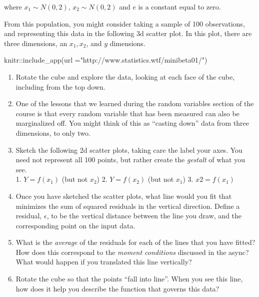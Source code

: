 \documentclass[
]{book}
\newenvironment{Shaded}{\begin{snugshade}}{\end{snugshade}}
\newcommand{\AttributeTok}[1]{\textcolor[rgb]{0.77,0.63,0.00}{#1}}
\newcommand{\FunctionTok}[1]{\textcolor[rgb]{0.00,0.00,0.00}{#1}}
\newcommand{\NormalTok}[1]{#1}
\newcommand{\SpecialCharTok}[1]{\textcolor[rgb]{0.00,0.00,0.00}{#1}}
\newcommand{\StringTok}[1]{\textcolor[rgb]{0.31,0.60,0.02}{#1}}
\providecommand{\tightlist}{%
  \setlength{\itemsep}{0pt}\setlength{\parskip}{0pt}}
\theoremstyle{definition}
\theoremstyle{definition}
\theoremstyle{definition}
\theoremstyle{definition}
\theoremstyle{remark}
\begin{document}
where \(x_1 \sim N(0,2)\), \(x_2 \sim N(0,2)\) and \(e\) is a constant equal to zero.

From this population, you might consider taking a sample of 100 observations, and representing this data in the following 3d scatter plot. In this plot, there are three dimensions, an \(x_1, x_2\), and \(y\) dimensions.

\begin{Shaded}
\begin{Highlighting}[]
\NormalTok{knitr}\SpecialCharTok{::}\FunctionTok{include\_app}\NormalTok{(}\AttributeTok{url =}\StringTok{"http://www.statistics.wtf/minibeta01/"}\NormalTok{)}
\end{Highlighting}
\end{Shaded}

\begin{enumerate}
\def\labelenumi{\arabic{enumi}.}
\tightlist
\item
  Rotate the cube and explore the data, looking at each face of the cube, including from the top down.
\item
  One of the lessons that we learned during the random variables section of the course is that every random variable that has been measured can also be marginalized off. You might think of this as ``casting down'' data from three dimensions, to only two.
\item
  Sketch the following 2d scatter plots, taking care the label your axes. You need not represent all 100 points, but rather create the \emph{gestalt} of what you see.\\
  1. \(Y = f(x_1)\) (but not \(x_2\))
  2. \(Y = f(x_2)\) (but not \(x_1\))
  3. \(x2 = f(x_1)\)
\item
  Once you have sketched the scatter plots, what line would you fit that minimizes the sum of squared residuals in the vertical direction. Define a residual, \(\epsilon\), to be the vertical distance between the line you draw, and the corresponding point on the input data.
\item
  What is the \emph{average} of the residuals for each of the lines that you have fitted? How does this correspond to the \emph{moment conditions} discussed in the async? What would happen if you translated this line vertically?
\item
  Rotate the cube so that the points ``fall into line''. When you see this line, how does it help you describe the function that governs this data?
\end{enumerate}
\end{document}
